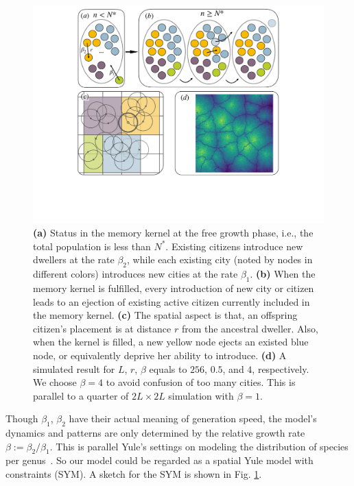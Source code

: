 \documentclass[reprint,unsortedaddress,amsmath,amssymb,aps,prl,showkeys]{revtex4-2}
\begin{document}
\begin{figure}
	\centering
	\includegraphics[width = 0.95\linewidth]{pics/sketchgood.pdf}
	\caption{\textbf{(a)} Status in the memory kernel at the free growth phase, i.e., the total population is less than $N^*$. Existing citizens introduce new dwellers at the rate $\beta_2$, while each existing city (noted by nodes in different colors) introduces new cities at the rate $\beta_1$. \textbf{(b)} When the memory kernel is fulfilled, every introduction of new city or citizen leads to an ejection of existing active citizen currently included in the memory kernel. \textbf{(c)} The spatial aspect is that, an offspring citizen's placement is at distance $r$ from the ancestral dweller. Also, when the kernel is filled, a new yellow node ejects an existed blue node, or equivalently deprive her ability to introduce. \textbf{(d)} A simulated result for $L$, $r$, $\beta$ equals to $256$, $0.5$, and $4$, respectively. We choose $\beta = 4$ to avoid confusion of too many cities. This is parallel to a quarter of $2L\times 2L$ simulation with $\beta = 1$.}
	\label{sketchpic}
\end{figure}

Though $\beta_1$, $\beta_2$ have their actual meaning of generation speed, the model's dynamics and patterns are only determined by the relative growth rate $\beta:= \beta_2/\beta_1$. This is parallel Yule's settings on modeling the distribution of species per genus~\cite{yule1925ii}.
So our model could be regarded as a spatial Yule model with constraints (SYM). A sketch for the SYM is shown in Fig. \ref{sketchpic}.
\end{document}
